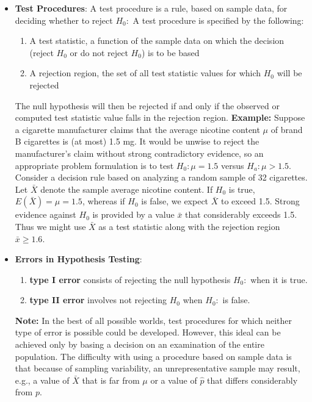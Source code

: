\documentclass{report}
\begin{document}
\begin{itemize}
    \item \textbf{Test Procedures}: A test procedure is a rule, based on sample data, for deciding whether to reject $H_{0}: $
        \bigbreak \noindent 
        A test procedure is specified by the following:
        \begin{enumerate}
            \item A test statistic, a function of the sample data on which the decision (reject $H_{0}$ or do not reject $H_{0}$) is to be based
            \item A rejection region, the set of all test statistic values for which $H_{0}$ will be rejected
        \end{enumerate}
        The null hypothesis will then be rejected if and only if the observed or computed test statistic value falls in the rejection region.
        \bigbreak \noindent 
        \textbf{Example:}  Suppose a cigarette manufacturer claims that the average nicotine content \( \mu \) of brand B cigarettes is (at most) 1.5 mg. It would be unwise to reject the manufacturer's claim without strong contradictory evidence, so an appropriate problem formulation is to test \( H_0: \mu = 1.5 \) versus \( H_a: \mu > 1.5 \). Consider a decision rule based on analyzing a random sample of 32 cigarettes. Let \( \bar{X} \) denote the sample average nicotine content. If \( H_0 \) is true, \( E(\bar{X}) = \mu = 1.5 \), whereas if \( H_0 \) is false, we expect \( \bar{X} \) to exceed 1.5. Strong evidence against \( H_0 \) is provided by a value \( \bar{x} \) that considerably exceeds 1.5. Thus we might use \( \bar{X} \) as a test statistic along with the rejection region \( \bar{x} \geq 1.6 \).
    \item \textbf{Errors in Hypothesis Testing}:
        \begin{enumerate}
            \item \textbf{type I error} consists of rejecting the null hypothesis $H_{0}:$ when it is true. 
            \item \textbf{type II error} involves not rejecting $H_{0}$ when $H_{0}:$ is false.
        \end{enumerate}
        \bigbreak \noindent 
        \textbf{Note:} In the best of all possible worlds, test procedures for which neither type of
error is possible could be developed. However, this ideal can be achieved only by
basing a decision on an examination of the entire population. The difficulty with
using a procedure based on sample data is that because of sampling variability, an
unrepresentative sample may result, e.g., a value of $\bar{X}$ that is far from $\mu$ or a value of $\hat{p}$ that differs considerably from $p$.

\end{itemize}
\end{document}
